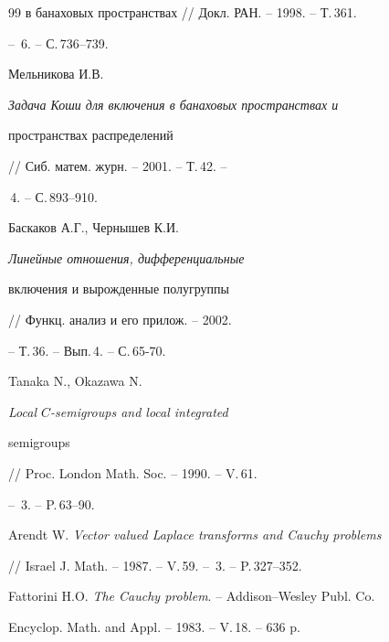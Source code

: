 \begin{thebibliography}{99}
{в банаховых пространствах} // Докл. РАН. -- 1998. -- Т.\,361. 


-- \No\,6. -- С.\,736--739. 




Мельникова И.В. {\em Задача Коши для включения в банаховых пространствах и 


пространствах распределений} // Сиб. матем. журн. -- 2001. -- Т.\,42. -- 


\No\,4. -- С.\,893--910. 




Баскаков А.Г., Чернышев К.И. {\em Линейные отношения, дифференциальные 


включения и вырожденные полугруппы} // Функц. анализ и его прилож. -- 2002. 


-- Т.\,36. -- Вып.\,4. -- С.\,65-70. 




Tanaka N., Okazawa N. {\em Local $C$-semigroups and local integrated 


semigroups} // Proc. London Math. Soc. -- 1990. -- V.\,61. 


-- \No\,3. -- P.\,63--90. 




Arendt W. {\em Vector valued Laplace transforms and Cauchy problems} 


// Israel J. Math. -- 1987. -- V.\,59. -- \No\,3. -- P.\,327--352. 




Fattorini H.O. {\em The Cauchy problem}. -- Addison--Wesley Publ. Co. 


Encyclop. Math. and Appl. -- 1983. -- V.\,18. -- 636 p. 


 


\end{thebibliography} 


 


\vskip 2cm 


 






 


\label{end} 


 


